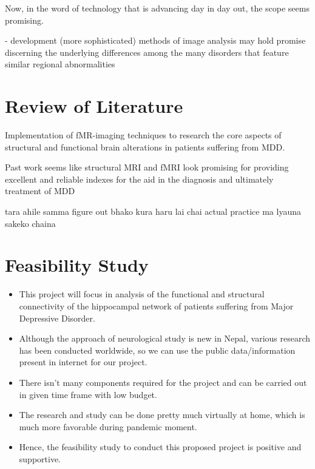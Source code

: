 \documentclass{article}
\begin{document}
Now, in the word of technology that is advancing day in day out,
the scope seems promising.

- development (more sophisticated) methods of image analysis may hold
  promise discerning the underlying differences among the many
  disorders that feature similar regional abnormalities

\newpage
\section{Review of Literature}


Implementation of fMR-imaging techniques to research the core aspects
of structural and functional brain alterations in patients suffering
from MDD.

Past work seems like structural MRI and fMRI look promising for
providing excellent and reliable indexes for the aid in the diagnosis
and ultimately treatment of MDD



tara ahile samma figure out bhako kura haru lai chai actual practice
ma lyauna sakeko chaina

\section{Feasibility Study}

\begin{itemize}

  \item This project will focus in analysis of the functional and
    structural connectivity of the hippocampal network of patients
    suffering from Major Depressive Disorder.

  \item Although the approach of neurological study is new in Nepal,
    various research has been conducted worldwide, so we can use the
    public data/information present in internet for our project.

  \item There isn't many components required for the project and can
    be carried out in given time frame with low budget.

  \item The research and study can be done pretty much virtually at
    home, which is much more favorable during pandemic moment.

  \item Hence, the feasibility study to conduct this proposed project
    is positive and supportive.

\end{itemize}
\end{document}

